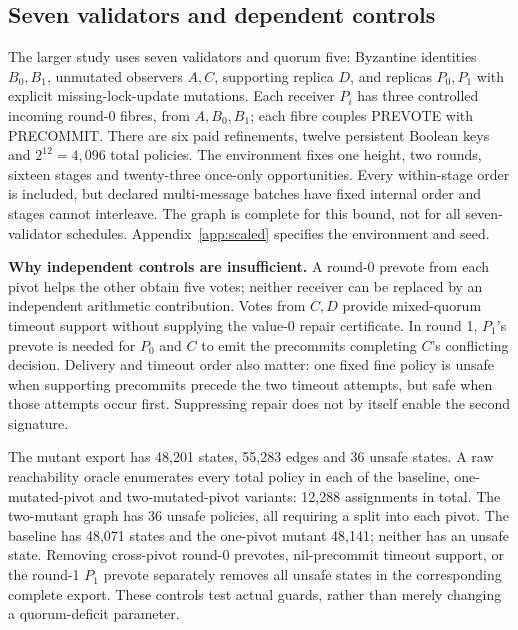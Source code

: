 \subsection{Seven validators and dependent
controls}\label{seven-validators-and-dependent-controls}

The larger study uses seven validators and quorum five: Byzantine
identities \(B_0,B_1\), unmutated observers \(A,C\), supporting replica
\(D\), and replicas \(P_0,P_1\) with explicit missing-lock-update
mutations. Each receiver \(P_i\) has three controlled incoming round-0
fibres, from \(A,B_0,B_1\); each fibre couples PREVOTE with PRECOMMIT.
There are six paid refinements, twelve persistent Boolean keys and
\(2^{12}=4,096\) total policies. The environment fixes one height, two
rounds, sixteen stages and twenty-three once-only opportunities. Every
within-stage order is included, but declared multi-message batches have
fixed internal order and stages cannot interleave. The graph is complete
for this bound, not for all seven-validator schedules.
Appendix~\ref{app:scaled} specifies the environment and seed.

\textbf{Why independent controls are insufficient.} A round-0 prevote
from each pivot helps the other obtain five votes; neither receiver can
be replaced by an independent arithmetic contribution. Votes from
\(C,D\) provide mixed-quorum timeout support without supplying the
value-0 repair certificate. In round 1, \(P_1\)'s prevote is needed for
\(P_0\) and \(C\) to emit the precommits completing \(C\)'s conflicting
decision. Delivery and timeout order also matter: one fixed fine policy
is unsafe when supporting precommits precede the two timeout attempts,
but safe when those attempts occur first. Suppressing repair does not by
itself enable the second signature.

The mutant export has 48,201 states, 55,283 edges and 36 unsafe states.
A raw reachability oracle enumerates every total policy in each of the
baseline, one-mutated-pivot and two-mutated-pivot variants: 12,288
assignments in total. The two-mutant graph has 36 unsafe policies, all
requiring a split into each pivot. The baseline has 48,071 states and
the one-pivot mutant 48,141; neither has an unsafe state. Removing
cross-pivot round-0 prevotes, nil-precommit timeout support, or the
round-1 \(P_1\) prevote separately removes all unsafe states in the
corresponding complete export. These controls test actual guards, rather
than merely changing a quorum-deficit parameter.

